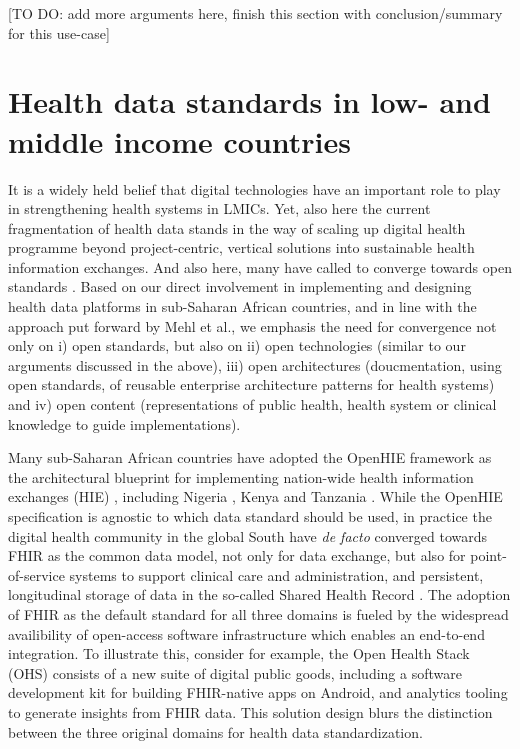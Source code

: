 \documentclass[
  authoryear]{elsarticle}
\begin{document}
{[}TO DO: add more arguments here, finish this section with
conclusion/summary for this use-case{]}

\section{Health data standards in low- and middle income
countries}\label{health-data-standards-in-low--and-middle-income-countries}

It is a widely held belief that digital technologies have an important
role to play in strengthening health systems in LMICs. Yet, also here
the current fragmentation of health data stands in the way of scaling up
digital health programme beyond project-centric, vertical solutions into
sustainable health information exchanges. And also here, many have
called to converge towards open standards \citep{mehl2023fullstac}.
Based on our direct involvement in implementing and designing health
data platforms in sub-Saharan African countries, and in line with the
approach put forward by Mehl et al., we emphasis the need for
convergence not only on i) open standards, but also on ii) open
technologies (similar to our arguments discussed in the above), iii)
open architectures (doucmentation, using open standards, of reusable
enterprise architecture patterns for health systems) and iv) open
content (representations of public health, health system or clinical
knowledge to guide implementations).

Many sub-Saharan African countries have adopted the OpenHIE framework
\citep{openhie} as the architectural blueprint for implementing
nation-wide health information exchanges (HIE) \citep{mamuye2022health},
including Nigeria \citep{dalhatu2023paper}, Kenya
\citep{thaiya2021adoption} and Tanzania \citep{nsaghurwe2021one}. While
the OpenHIE specification is agnostic to which data standard should be
used, in practice the digital health community in the global South have
\emph{de facto} converged towards FHIR as the common data model, not
only for data exchange, but also for point-of-service systems to support
clinical care and administration, and persistent, longitudinal storage
of data in the so-called Shared Health Record
\citep{ohie2023unconference}. The adoption of FHIR as the default
standard for all three domains is fueled by the widespread availibility
of open-access software infrastructure which enables an end-to-end
integration. To illustrate this, consider for example, the Open Health
Stack (OHS) consists of a new suite of digital public goods, including a
software development kit for building FHIR-native apps on Android, and
analytics tooling to generate insights from FHIR data. This solution
design blurs the distinction between the three original domains for
health data standardization.
\end{document}
